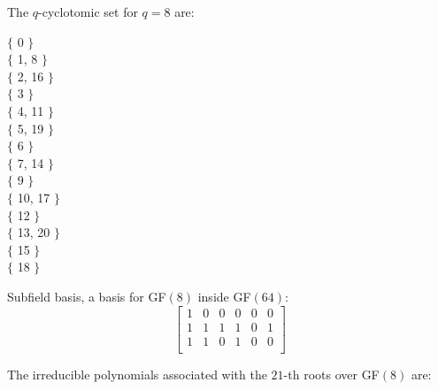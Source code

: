 \begin{mdframed}[style=MyFrame]
\noindent The $q$-cyclotomic set for $q=8$ are:

\noindent $\{$ 0 $\}$\\
$\{$ 1, 8 $\}$\\
$\{$ 2, 16 $\}$\\
$\{$ 3 $\}$\\
$\{$ 4, 11 $\}$\\
$\{$ 5, 19 $\}$\\
$\{$ 6 $\}$\\
$\{$ 7, 14 $\}$\\
$\{$ 9 $\}$\\
$\{$ 10, 17 $\}$\\
$\{$ 12 $\}$\\
$\{$ 13, 20 $\}$\\
$\{$ 15 $\}$\\
$\{$ 18 $\}$\\
\bigskip

Subfield basis, a basis for GF$(8)$ inside GF$(64)$:
$$
\left[
\begin{array}{*{6}{c}}
1 & 0 & 0 & 0 & 0 & 0\\
1 & 1 & 1 & 1 & 0 & 1\\
1 & 1 & 0 & 1 & 0 & 0\\
\end{array}
\right]
$$
\bigskip

The irreducible polynomials associated with the $21$-th roots over GF$(8)$ are:

\bigskip



\end{mdframed}
